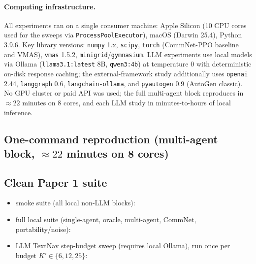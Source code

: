 \documentclass{article}
\begin{document}
\paragraph{Computing infrastructure.} All experiments ran on a single
consumer machine: Apple Silicon (10 CPU cores used for the sweeps via
\texttt{ProcessPoolExecutor}), macOS (Darwin 25.4), Python 3.9.6.
Key library versions: \texttt{numpy} 1.x, \texttt{scipy},
\texttt{torch} (CommNet-PPO baseline and VMAS), \texttt{vmas} 1.5.2,
\texttt{minigrid}/\texttt{gymnasium}. LLM experiments use local
models via Ollama (\texttt{llama3.1:latest} 8B, \texttt{qwen3:4b}) at
temperature $0$ with deterministic on-disk response caching; the
external-framework study additionally uses \texttt{openai} 2.44,
\texttt{langgraph} 0.6, \texttt{langchain-ollama}, and
\texttt{pyautogen} 0.9 (AutoGen classic). No GPU cluster or paid API
was used; the full multi-agent block reproduces in ${\approx}22$
minutes on 8 cores, and each LLM study in minutes-to-hours of local
inference.

\subsection*{One-command reproduction (multi-agent block, $\approx 22$ minutes on 8 cores)}

\subsection*{Clean Paper 1 suite}
\begin{itemize}[leftmargin=16pt]
\item smoke suite (all local non-LLM blocks): 
\item full local suite (single-agent, oracle, multi-agent, CommNet, portability/noise): 
\item LLM TextNav step-budget sweep (requires local Ollama), run once per budget $K'\in\{6,12,25\}$: 
\end{itemize}
\end{document}
